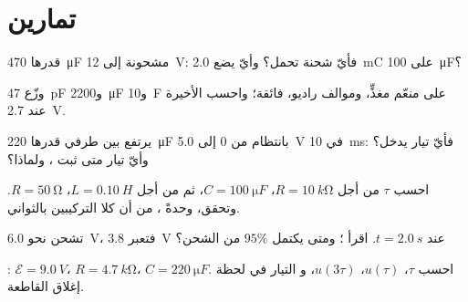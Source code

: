 \section{تمارين}

\begin{exercise}[$\star$]\label{exo:g12:rc-rl-circuits:1}
 قدرها \qty{470}{\micro F} مشحونة إلى \qty{12}{V}: فأيّ شحنة
تحمل؟ وأيّ  يضع \qty{2.0}{mC} على \qty{100}{\micro F}؟
\end{exercise}

\begin{exercise}[$\star$]\label{exo:g12:rc-rl-circuits:2}
وزّع \qty{47}{pF} و\qty{2200}{\micro F} و\qty{10}{F} على منعّم مغذٍّ،
وموالف راديو،  فائقة؛ واحسب  الأخيرة
عند \qty{2.7}{V}.
\end{exercise}

\begin{exercise}[$\star$]\label{exo:g12:rc-rl-circuits:3}
يرتفع  بين طرفي  قدرها \qty{220}{\micro F} بانتظام من $0$
إلى \qty{5.0}{V} في \qty{10}{ms}: فأيّ تيار يدخل؟ وأيّ تيار متى ثبت
، ولماذا؟
\end{exercise}

\begin{exercise}[$\star$]\label{exo:g12:rc-rl-circuits:4}
احسب $\tau$ من أجل $R = \qty{10}{k\ohm}$، $C = \qty{100}{\micro F}$، ثم
من أجل $L = \qty{0.10}{H}$، $R = \qty{50}{\ohm}$. وتحقق، وحدةً ، من أن
كلا التركيبين بالثواني.
\end{exercise}

\begin{exercise}[$\star$]\label{exo:g12:rc-rl-circuits:5}
 تشحن نحو \qty{6.0}{V}، فتعبر \qty{3.8}{V} عند
$t = \qty{2.0}{s}$. اقرأ ؛ ومتى يكتمل $95\%$ من الشحن؟
\end{exercise}

\begin{exercise}[$\star\star$]\label{exo:g12:rc-rl-circuits:6}
: $\mathcal{E} = \qty{9.0}{V}$، $R = \qty{4.7}{k\ohm}$،
$C = \qty{220}{\micro F}$. احسب $\tau$، $u(\tau)$، $u(3\tau)$، و
التيار في لحظة إغلاق القاطعة.
\end{exercise}

